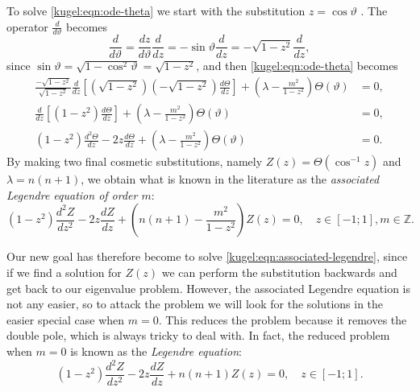 To solve \eqref{kugel:eqn:ode-theta} we start with the substitution $z = \cos
\vartheta$ . The operator
$\frac{d}{d \vartheta}$ becomes
\begin{equation*}
    \frac{d}{d \vartheta}
    = \frac{dz}{d \vartheta}\frac{d}{dz}
    = -\sin \vartheta \frac{d}{dz}
    = -\sqrt{1-z^2} \frac{d}{dz},
\end{equation*} 
since $\sin \vartheta = \sqrt{1 - \cos^2 \vartheta} = \sqrt{1 - z^2}$, and
then \eqref{kugel:eqn:ode-theta} becomes 
\begin{align*}
  \frac{-\sqrt{1-z^2}}{\sqrt{1-z^2}} \frac{d}{dz} \left[
    \left(\sqrt{1-z^2}\right) \left(-\sqrt{1-z^2}\right) \frac{d \Theta}{dz}
  \right]
  + \left( \lambda - \frac{m^2}{1 - z^2} \right)\Theta(\vartheta) &= 0,
  \\
  \frac{d}{dz} \left[ (1-z^2) \frac{d \Theta}{dz} \right]
  + \left( \lambda - \frac{m^2}{1 - z^2} \right)\Theta(\vartheta) &= 0,
  \\
  (1-z^2)\frac{d^2 \Theta}{dz} - 2z\frac{d \Theta}{dz}
  + \left( \lambda - \frac{m^2}{1 - z^2} \right)\Theta(\vartheta) &= 0.
\end{align*}
By making two final cosmetic substitutions, namely $Z(z) = \Theta(\cos^{-1}z)$
and $\lambda = n(n+1)$, we obtain what is known in the literature as the
\emph{associated Legendre equation of order $m$}:
\nocite{olver_introduction_2013}
\begin{equation} \label{kugel:eqn:associated-legendre}
  (1 - z^2)\frac{d^2 Z}{dz^2}
  - 2z\frac{d Z}{dz}
  + \left( n(n + 1) - \frac{m^2}{1 - z^2} \right) Z(z) = 0,
  \quad
  z \in [-1; 1], m \in \mathbb{Z}.
\end{equation}

Our new goal has therefore become to solve
\eqref{kugel:eqn:associated-legendre}, since if we find a solution for $Z(z)$ we
can perform the substitution backwards and get back to our eigenvalue problem.
However, the associated Legendre equation is not any easier, so to attack the
problem we will look for the solutions in the easier special case when $m = 0$.
This reduces the problem because it removes the double pole, which is always
tricky to deal with. In fact, the reduced problem when $m = 0$ is known as the
\emph{Legendre equation}:
\begin{equation} \label{kugel:eqn:legendre}
  (1 - z^2)\frac{d^2 Z}{dz^2}
  - 2z\frac{d Z}{dz}
  + n(n + 1) Z(z) = 0,
  \quad
  z \in [-1; 1].
\end{equation}

